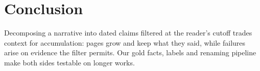 \section{Conclusion}
\label{sec:conclusion}

Decomposing a narrative into dated claims filtered at the reader's cutoff trades context for
accumulation: pages grow and keep what they said, while failures arise on evidence the filter
permits. Our gold facts, labels and renaming pipeline make both sides testable on longer works.
